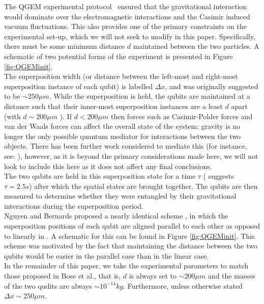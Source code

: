 \documentclass[%
 reprint,
 superscriptaddress,
 amsmath,
 amssymb,
 aps,
 longbibliography
]{revtex4-2}
\begin{document}
The QGEM experimental protocol~\cite{Bose2017,Kamp2020} ensured that the gravitational interaction would dominate over the electromagnetic interactions and the Casimir induced vacuum fluctuations. 
This also provides one of the primary constraints on the experimental set-up, which we will not seek to modify in this paper. Specifically, there must be some minimum distance $d$ maintained between the two particles. A schematic of two potential forms of the experiment is presented in Figure \ref{fig:QGEMinit}. \\
\indent The superposition width (or distance between the left-most and right-most superposition instance of each qubit) is labelled $\Delta x$, and was originally suggested to be $\sim 250 \mu m$\cite{Bose2017}. While the superposition is held, the qubits are maintained at a distance such that their inner-most superposition instances are a least $d$ apart (with $d\sim 200 \mu m$ \cite{Bose2017}). If $d<200 \mu m$ then forces such as Casimir-Polder forces and van der Waals forces can affect the overall state of the system: gravity is no longer the only possible quantum mediator for interactions between the two objects. There has been further work considered to mediate this (for instance, see: \cite{Kamp2020}), however, as it is beyond the primary considerations made here, we will not look to include this here as it does not affect any final conclusions. \\
\indent The two qubits are held in this superposition state for a time $\tau$ (\cite{Bose2017} suggests $\tau=2.5s$) after which the spatial states are brought together. The qubits are then measured to determine whether they were entangled by their gravitational interactions during the superposition period. \\
\indent Nguyen and Bernards proposed a nearly identical scheme \cite{Nguyen2019}, in which the superposition positions of each qubit are aligned parallel to each other as opposed to linearly in \cite{Bose2017,Kamp2020}. A schematic for this can be found in Figure \ref{fig:QGEMinit}. This scheme was motivated by the fact that maintaining the distance between the two qubits would be easier in the parallel case than in the linear case. \\
\indent In the remainder of this paper, we take the experimental parameters to match those proposed in Bose et al., that is, $d$ is always set to $\sim200 \mu m $ and the masses of the two qudits are always $\sim10^{-14} kg$. Furthermore, unless otherwise stated $\Delta x\sim250 \mu m$.\\ 
\end{document}
